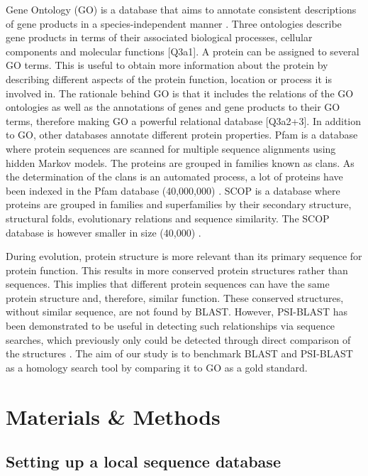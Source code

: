 \documentclass{article}
\begin{document}
Gene Ontology (GO) is a database that aims to annotate consistent descriptions of gene products in a species-independent manner \citep{ashburner_gene_2000}. Three ontologies describe gene products in terms of their associated biological processes, cellular components and molecular functions \citep{smith_ontology_2003} [Q3a1]. A protein can be assigned to several GO terms. This is useful to obtain more information about the protein by describing different aspects of the protein function, location or process it is involved in. The rationale behind GO is that it includes the relations of the GO ontologies as well as the annotations of genes and gene products to their GO terms, therefore making GO a powerful relational database \citep{ashburner_gene_2000} [Q3a2+3]. In addition to GO, other databases annotate different protein properties. Pfam is a database where protein sequences are scanned for multiple sequence alignments using hidden Markov models. The proteins are grouped in families known as clans. As the determination of the clans is an automated process, a lot of proteins have been indexed in the Pfam database (40,000,000) \citep{finn_pfam_2014}. SCOP is a database where proteins are grouped in families and superfamilies by their secondary structure, structural folds, evolutionary relations and sequence similarity. The SCOP database is however smaller in size (40,000) \citep{conte_scop_2000}.

During evolution, protein structure is more relevant than its primary sequence for protein function. This results in more conserved protein structures rather than sequences. This implies that different protein sequences can have the same protein structure and, therefore, similar function. These conserved structures, without similar sequence, are not found by BLAST. However, PSI-BLAST has been demonstrated to be useful in detecting such relationships via sequence searches, which previously only could be detected through direct comparison of the structures \citep{bhagwat_psi-blast_2007}. The aim of our study is to benchmark BLAST and PSI-BLAST as a homology search tool by comparing it to GO as a gold standard.

\newpage
\section{Materials \& Methods}
\subsection{Setting up a local sequence database}
\end{document}
